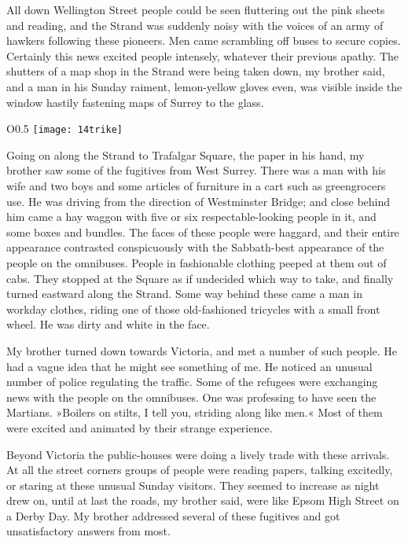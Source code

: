 All down Wellington Street people could be seen fluttering out the pink sheets and reading, and the Strand was suddenly noisy with the voices of an army of hawkers following these pioneers. Men came scrambling off buses to secure copies. Certainly this news excited people intensely, whatever their previous apathy. The shutters of a map shop in the Strand were being taken down, my brother said, and a man in his Sunday raiment, lemon-yellow gloves even, was visible inside the window hastily fastening maps of Surrey to the glass.

\begin{wrapfigure}{O}{0.5\textwidth}
\centering
\texttt{[image: 14trike]}
\end{wrapfigure}

Going on along the Strand to Trafalgar Square, the paper in his hand, my brother saw some of the fugitives from West Surrey. \label{brojourney4} There was a man with his wife and two boys and some articles of furniture in a cart such as greengrocers use. He was driving from the direction of Westminster Bridge; and close behind him came a hay waggon with five or six respectable-looking people in it, and some boxes and bundles. The faces of these people were haggard, and their entire appearance contrasted conspicuously with the Sabbath-best appearance of the people on the omnibuses. People in fashionable clothing peeped at them out of cabs. They stopped at the Square as if undecided which way to take, and finally turned eastward along the Strand. Some way behind these came a man in workday clothes, riding one of those old-fashioned tricycles with a small front wheel. He was dirty and white in the face.

My brother turned down towards Victoria,\label{brojourney5} and met a number of such people. He had a vague idea that he might see something of me. He noticed an unusual number of police regulating the traffic. Some of the refugees were exchanging news with the people on the omnibuses. One was professing to have seen the Martians. »Boilers on stilts, I tell you, striding along like men.« Most of them were excited and animated by their strange experience.

Beyond Victoria the public-houses were doing a lively trade with these arrivals. At all the street corners groups of people were reading papers, talking excitedly, or staring at these unusual Sunday visitors. They seemed to increase as night drew on, until at last the roads, my brother said, were like Epsom High Street on a Derby Day. My brother addressed several of these fugitives and got unsatisfactory answers from most.

